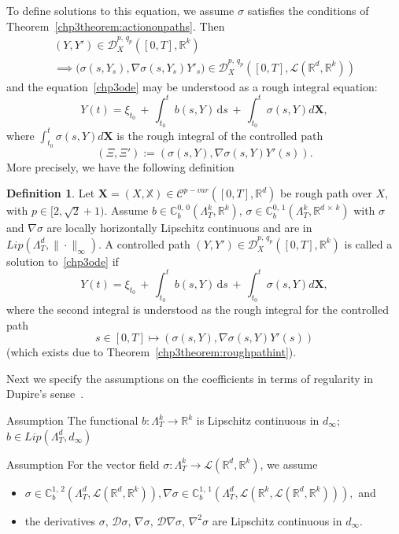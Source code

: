 \documentclass[10pt]{amsart}
\theoremstyle{definition}\newtheorem{defi}[theo]{Definition}\newtheorem{rema}[theo]{Remark}\newtheorem{exam}[theo]{Example}\newtheorem{exem}[theo]{Example}\newtheorem{nota}[theo]{Notation}
\renewcommand*\d{\mathrm{d}}
\newcommand{\scrD}{\mathscr{D}}
\newcommand{\bbX}{\mathbb{X}}
\newcommand{\bbC}{\mathbb{C}}
\newcommand{\calD}{\mathcal{D}}
\newcommand{\calL}{\mathcal{L}}
\newcommand{\calC}{\mathcal{C}}
\newcommand{\Rr}{{\mathbb{R}}}
\begin{document}
To define solutions to this equation, we assume $\sigma$ satisfies the conditions of Theorem~\ref{chp3theorem:actiononpaths}. Then
\begin{multline*}
\left(Y, Y'\right)\in\scrD^{p,\,q_p}_{X} \left([0,T],\Rr^k\right)\\
\implies\big(\sigma\left(s,Y_s\right), \nabla \sigma\left(s,Y_s\right)Y'_s\big)\in \scrD^{p,\,q_p}_{X}\left([0,T],\calL\left(\Rr^d,\Rr^k\right)\right)
\end{multline*}
and the equation~\eqref{chp3ode} may be understood as a rough integral equation:
\[
Y(t)=\xi_{t_0}\,+\, \int_{t_0}^t b(s, Y)\, \d s\,+\,\int_{t_0}^t \sigma(s, Y) d\bm{X},
\]
where $\int_{t_0}^t \sigma(s, Y) d\bm{X}$ is the rough integral of the controlled path
\[
\left(\Xi, \Xi'\right):=\left(\sigma(s,Y), \nabla \sigma(s,Y)Y'(s)\right).
\]
More precisely, we have the following definition

\begin{defi}\label{chp3def.odesol}
Let $\bm{X}=(X, \bbX)\in \calC^{p-var}([0,T],\Rr^d)$ be rough path over $X$, with $p\in [2, \sqrt{2}+1)$. Assume $b\in \bbC^{0,\,0}_b(\Lambda^k_T,\Rr^k),\, \sigma\in \bbC^{0,\,1}_b(\Lambda^k_T,\Rr^{d\,\times\,k})$ with $\sigma$ and $ \nabla \sigma$ are locally horizontally Lipschitz continuous and are in $Lip(\Lambda^d_T, \|\cdot\|_{\infty})$. A controlled path $(Y, Y')\in\scrD^{p,\,q_p}_{X}([0,T],\Rr^k)$ is called a solution to~\eqref{chp3ode} if
\begin{equation}\label{chp3eq:odedef}
Y(t)=\xi_{t_0}\,+\, \int_{t_0}^t b(s, Y)\, \d s\,+\,\int_{t_0}^t \sigma(s, Y) d\bm{X},
\end{equation}
where the second integral is understood as the rough integral for the controlled path
\[
s\in[0,T]\mapsto \left(\sigma(s,Y), \nabla \sigma(s,Y)Y'(s)\right)
\]
(which exists due to Theorem~\ref{chp3theorem:roughpathint}).
\end{defi}

Next we specify the assumptions on the coefficients in terms of regularity in Dupire's sense~\cite{CF09,D09}.

\begin{enonce}{Assumption}\label{ass:b}
The functional $b\colon \Lambda_T^k\to\Rr^k$ is Lipschitz continuous in $d_{\infty}$; $b\in Lip(\Lambda^{d}_T, d_{\infty})$
\end{enonce}

\begin{enonce}{Assumption}\label{ass:sigma}
For the vector field $\sigma\colon \Lambda_T^k \to \calL(\Rr^d,\Rr^k)$, we assume
\begin{itemize}
\item $\sigma\in \bbC^{1,\,2}_b(\Lambda^{d}_T, \calL(\Rr^d,\Rr^k)), \nabla \sigma\in \bbC^{1,\,1}_b(\Lambda^{d}_T, \calL(\Rr^k,\calL(\Rr^d,\Rr^k))),$ and
\item the derivatives $\sigma,\, \calD \sigma,\, \nabla \sigma,\,\calD\nabla \sigma,\, \nabla^2 \sigma$ are Lipschitz continuous in $d_{\infty}$.
\end{itemize}
\end{enonce}
\end{document}
